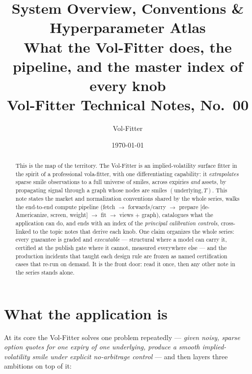 \documentclass[11pt]{article}
\title{\textbf{System Overview, Conventions \& Hyperparameter Atlas}\\[2pt]
\large What the Vol-Fitter does, the pipeline, and the master index of every knob\\[2pt]
\normalsize Vol-Fitter Technical Notes, No.~00}
\author{Vol-Fitter}
\date{\today}
\begin{document}
\maketitle

\begin{abstract}
This is the map of the territory. The Vol-Fitter is an implied-volatility
surface fitter in the spirit of a professional vola-fitter, with one
differentiating capability: it \emph{extrapolates} sparse smile observations to
a full universe of smiles, across expiries \emph{and} assets, by propagating
signal through a graph whose nodes are smiles $(\text{underlying},T)$. This note
states the market and normalization conventions shared by the whole series,
walks the end-to-end compute pipeline (fetch $\to$ forwards/carry $\to$ prepare
[de-Americanize, screen, weight] $\to$ fit $\to$ views $+$ graph), catalogues
what the application can do, and ends with an index of the \emph{principal
calibration controls}, cross-linked to the topic notes that derive each knob.
One claim organizes the whole series: every guarantee is graded and
\emph{executable} --- structural where a model can carry it, certified at the
publish gate where it cannot, measured everywhere else --- and the production
incidents that taught each design rule are frozen as named certification cases
that re-run on demand. It is the front door: read it once, then any other note
in the series stands alone.
\end{abstract}

\tableofcontents
\newpage

\section{What the application is}
\label{sec:what}

At its core the Vol-Fitter solves one problem repeatedly --- \emph{given noisy,
sparse option quotes for one expiry of one underlying, produce a smooth
implied-volatility smile under explicit no-arbitrage control} --- and then
layers three ambitions on top of it:
\end{document}
